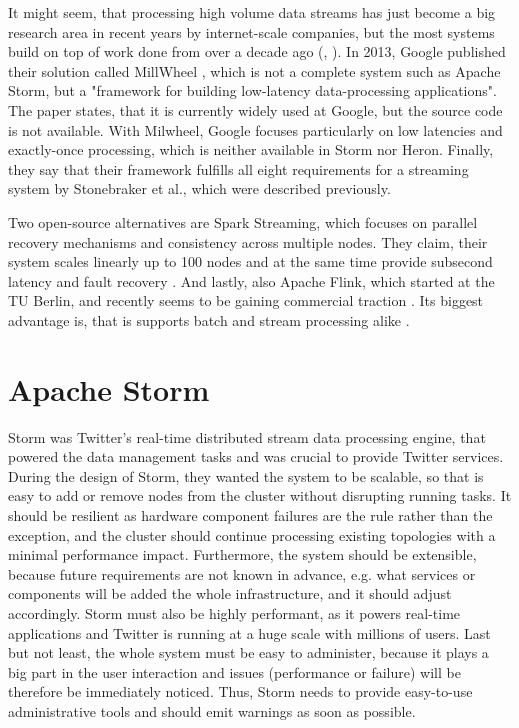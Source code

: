 \documentclass[conference]{IEEEtran}
\begin{document}
It might seem, that processing high volume data streams has just become a big research area in recent years by internet-scale companies, but the most systems build on top of work done from over a decade ago (\cite{StreamStanford}, \cite{Aurora}).
In 2013, Google published their solution called MillWheel \cite{Millwheel}, which is not a complete system such as Apache Storm, but a "framework for building low-latency data-processing applications".
The paper states, that it is currently widely used at Google, but the source code is not available.
With Milwheel, Google focuses particularly on low latencies and exactly-once processing, which is neither available in Storm nor Heron.
Finally, they say that their framework fulfills all eight requirements for a streaming system by Stonebraker et al., which were described previously.

Two open-source alternatives are Spark Streaming, which focuses on parallel recovery mechanisms and consistency across multiple nodes.
They claim, their system scales linearly up to 100 nodes and at the same time provide subsecond latency and fault recovery \cite{SparkStreaming}.
And lastly, also Apache Flink, which started at the TU Berlin, and recently seems to be gaining commercial traction \cite{FlinkUpcoming}.
Its biggest advantage is, that is supports batch and stream processing alike \cite{Flink}.

\section{Apache Storm}
\label{sec:ApacheStorm}

Storm was Twitter's real-time distributed stream data processing engine, that powered the data management tasks and was crucial to provide Twitter services.
During the design of Storm, they wanted the system to be scalable, so that is easy to add or remove nodes from the cluster without disrupting running tasks.
It should be resilient as hardware component failures are the rule rather than the exception, and the cluster should continue processing existing topologies with a minimal performance impact.
Furthermore, the system should be extensible, because future requirements are not known in advance, e.g. what services or components will be added the whole infrastructure, and it should adjust accordingly.
Storm must also be highly performant, as it powers real-time applications and Twitter is running at a huge scale with millions of users.
Last but not least, the whole system must be easy to administer, because it plays a big part in the user interaction and issues (performance or failure) will be therefore be immediately noticed.
Thus, Storm needs to provide easy-to-use administrative tools and should emit warnings as soon as possible.
\end{document}
